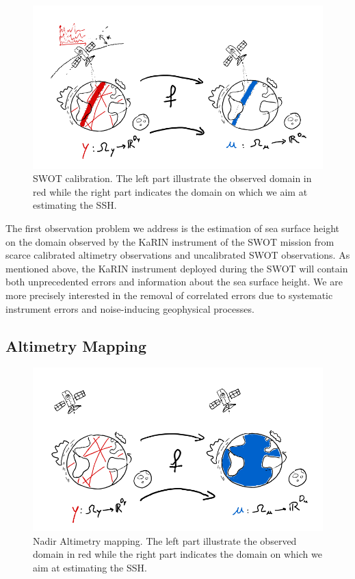 \begin{bibunit}
  \begin{figure}
      \centering
            \includegraphics[width=\linewidth]{Introduction/pics/calib_task.png}    
      \caption{SWOT calibration. The left part illustrate the observed domain in red while the right part indicates the domain on which we aim at estimating the SSH.}
      \label{fig:calibration_task}
  \end{figure}
The first observation problem we address is the estimation of sea surface height on the domain observed by the KaRIN instrument of the SWOT mission from scarce calibrated altimetry observations and uncalibrated SWOT observations.
As mentioned above, the KaRIN instrument deployed during the SWOT will contain both unprecedented errors and information about the sea surface height.
We are more precisely interested in the removal of correlated errors due to systematic instrument errors and noise-inducing geophysical processes.



\subsection{Altimetry Mapping}

  \begin{figure}
      \centering
            \includegraphics[width=\linewidth]{Introduction/pics/mapping_task.png}
      \caption{Nadir Altimetry mapping. The left part illustrate the observed domain in red while the right part indicates the domain on which we aim at estimating the SSH.}
      \label{fig:mapping_task}
  \end{figure}


\end{bibunit}
